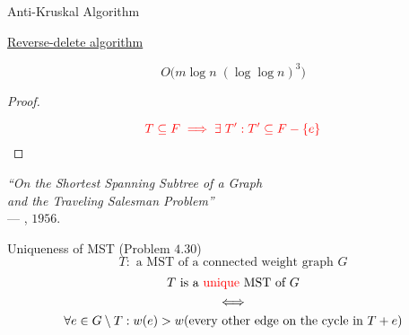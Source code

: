 \begin{frame}{}
  \begin{exampleblock}{Anti-Kruskal Algorithm}
    \centerline{\href{https://en.wikipedia.org/wiki/Reverse-delete_algorithm}{Reverse-delete algorithm }}
  \end{exampleblock}

  \pause
  \[
    O\Big(m \log n\; (\log \log n)^3\Big)
  \]

  \pause
  \begin{proof}
    \centerline{}
    \pause
    \[
      \textcolor{red}{T \subseteq F \implies \exists\; T': T' \subseteq F - \left\{e\right\}}
    \]
  \end{proof}

  \pause
  \vspace{0.20cm}
  \begin{center}
    {\it ``On the Shortest Spanning Subtree of a Graph \\
    and the Traveling Salesman Problem''} \\
    \hfill --- , $1956$.
  \end{center}
\end{frame}

\begin{frame}{}
  \begin{exampleblock}{Uniqueness of MST (Problem $4.30$)}
    \[
      T: \text{ a MST of a connected weight graph } G
    \]
    \begin{gather*}
      T \text{ is a \textcolor{red}{unique} MST of } G \\
      \iff \\
      \forall e \in G \setminus T:
      w(e) > w(\text{every other edge on the cycle in $T + e$})
    \end{gather*}
  \end{exampleblock}

  \pause
\end{frame}


